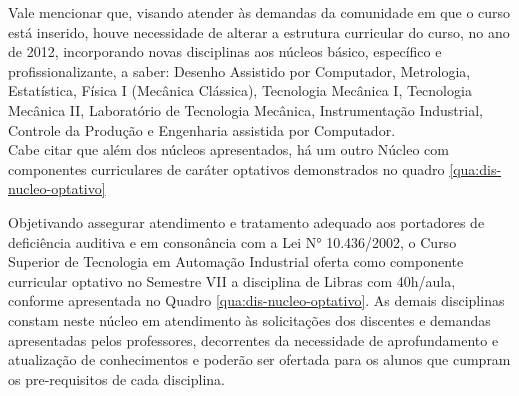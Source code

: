 Vale mencionar que, visando atender às demandas da comunidade em que o curso está inserido, houve necessidade de alterar a estrutura curricular do curso, no ano de 2012, incorporando novas disciplinas aos núcleos básico, específico e profissionalizante, a saber: Desenho Assistido por Computador, Metrologia, Estatística, Física I (Mecânica Clássica), Tecnologia Mecânica I, Tecnologia Mecânica II, Laboratório de Tecnologia Mecânica, Instrumentação Industrial, Controle da Produção e Engenharia assistida por Computador.\\

Cabe citar que além dos núcleos apresentados, há um outro Núcleo com componentes curriculares de caráter optativos demonstrados no quadro \ref{qua:dis-nucleo-optativo}\\

\begin{quadro}[!h]	
\centering
{}		
\end{quadro}

Objetivando assegurar atendimento e tratamento adequado aos portadores de deficiência auditiva e em consonância com a Lei N° 10.436/2002, o Curso Superior de Tecnologia em Automação Industrial oferta como componente curricular optativo no Semestre VII a disciplina de Libras com 40h/aula, conforme apresentada no Quadro \ref{qua:dis-nucleo-optativo}. As demais disciplinas constam neste núcleo em atendimento às solicitações dos discentes e demandas apresentadas pelos professores, decorrentes da necessidade de aprofundamento e atualização de conhecimentos e poderão ser ofertada para os alunos que cumpram os pre-requisitos de cada disciplina.\\

